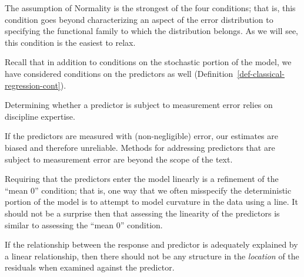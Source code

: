 \documentclass[
  letterpaper,
  DIV=11,
  numbers=noendperiod]{scrreprt}
\theoremstyle{definition}
\theoremstyle{definition}
\theoremstyle{remark}
\begin{document}
The assumption of Normality is the strongest of the four conditions;
that is, this condition goes beyond characterizing an aspect of the
error distribution to specifying the functional family to which the
distribution belongs. As we will see, this condition is the easiest to
relax.

Recall that in addition to conditions on the stochastic portion of the
model, we have considered conditions on the predictors as well
(Definition~\ref{def-classical-regression-cont}).

\begin{tcolorbox}[enhanced jigsaw, left=2mm, toprule=.15mm, arc=.35mm, breakable, opacitybacktitle=0.6, opacityback=0, rightrule=.15mm, colbacktitle=quarto-callout-note-color!10!white, coltitle=black, leftrule=.75mm, toptitle=1mm, colframe=quarto-callout-note-color-frame, titlerule=0mm, title=\textcolor{quarto-callout-note-color}{\faInfo}\hspace{0.5em}{Assessing Measurement Error in the Predictors}, bottomrule=.15mm, colback=white, bottomtitle=1mm]

Determining whether a predictor is subject to measurement error relies
on discipline expertise.

\end{tcolorbox}

If the predictors are measured with (non-negligible) error, our
estimates are biased and therefore unreliable. Methods for addressing
predictors that are subject to measurement error are beyond the scope of
the text.

Requiring that the predictors enter the model linearly is a refinement
of the ``mean 0'' condition; that is, one way that we often misspecify
the deterministic portion of the model is to attempt to model curvature
in the data using a line. It should not be a surprise then that
assessing the linearity of the predictors is similar to assessing the
``mean 0'' condition.

\begin{tcolorbox}[enhanced jigsaw, left=2mm, toprule=.15mm, arc=.35mm, breakable, opacitybacktitle=0.6, opacityback=0, rightrule=.15mm, colbacktitle=quarto-callout-note-color!10!white, coltitle=black, leftrule=.75mm, toptitle=1mm, colframe=quarto-callout-note-color-frame, titlerule=0mm, title=\textcolor{quarto-callout-note-color}{\faInfo}\hspace{0.5em}{Assessing Linearity of the Predictors}, bottomrule=.15mm, colback=white, bottomtitle=1mm]

If the relationship between the response and predictor is adequately
explained by a linear relationship, then there should not be any
structure in the \emph{location} of the residuals when examined against
the predictor.

\end{tcolorbox}
\end{document}
